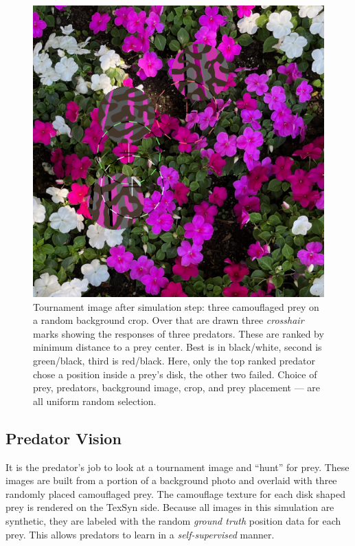\documentclass[letterpaper]{article}
\newcommand{\jargon}[1]{\textit{#1}}
\newcommand{\texsyn}[0]{TexSyn}
\begin{document}
\begin{figure}
    \centering
    \includegraphics[width=0.7\columnwidth]{20221007_0806_step_7030.png}
    \caption{Tournament image after simulation step: three camouflaged prey on a random background crop. Over that are drawn three \jargon{crosshair} marks showing the responses of three predators. These are ranked by minimum distance to a prey center. Best is in black/white, second is green/black, third is red/black. Here, only the top ranked predator chose a position inside a prey's disk, the other two failed. Choice of prey, predators, background image, crop, and prey placement — are all uniform random selection.}
    \label{fig:predator_responses}
\end{figure}



\subsection{Predator Vision}
It is the predator's job to look at a tournament image and “hunt” for prey. These images are built from a portion of a background photo and overlaid with three randomly placed camouflaged prey. The camouflage texture for each disk shaped prey is rendered on the \texsyn{} side. Because all images in this simulation are synthetic, they are labeled with the random \jargon{ground truth} position data for each prey. This allows predators to learn in a \jargon{self-supervised} manner.
\par
\end{document}
